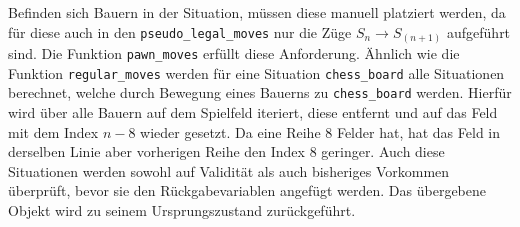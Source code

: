 \documentclass[12pt]{article}
\begin{document}
    Befinden sich Bauern in der Situation, müssen diese manuell platziert
werden, da für diese auch in den \texttt{pseudo\_legal\_moves} nur die
Züge \(S_n \rightarrow S_{(n+1)}\) aufgeführt sind. Die Funktion
\texttt{pawn\_moves} erfüllt diese Anforderung. Ähnlich wie die Funktion
\texttt{regular\_moves} werden für eine Situation \texttt{chess\_board}
alle Situationen berechnet, welche durch Bewegung eines Bauerns zu
\texttt{chess\_board} werden. Hierfür wird über alle Bauern auf dem
Spielfeld iteriert, diese entfernt und auf das Feld mit dem Index
\(n-8\) wieder gesetzt. Da eine Reihe 8 Felder hat, hat das Feld in
derselben Linie aber vorherigen Reihe den Index 8 geringer. Auch diese
Situationen werden sowohl auf Validität als auch bisheriges Vorkommen
überprüft, bevor sie den Rückgabevariablen angefügt werden. Das
übergebene Objekt wird zu seinem Ursprungszustand zurückgeführt.
\end{document}
